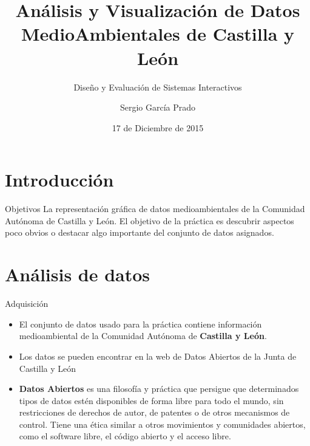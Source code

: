 \documentclass{beamer}
\title[Análisis y Visualización de Datos MedioAmbientales de Castilla y León]{Análisis y Visualización de Datos MedioAmbientales de Castilla y León}
\subtitle[Diseño y Evaluación de Sistemas Interactivos]{Diseño y Evaluación de Sistemas Interactivos}
\author{Sergio García Prado\\}
\date{17 de Diciembre de 2015}
\begin{document}

	\begin{frame}
		\titlepage
	\end{frame}

	
	\begin{frame}
		\tableofcontents
	\end{frame}


	\section{Introducción}

		\begin{frame}{Objetivos}
 			La representación gráfica de datos medioambientales de la Comunidad Autónoma de Castilla y León. El objetivo de la práctica es descubrir aspectos poco obvios o destacar algo importante del conjunto de datos asignados.

		\end{frame}
		
	\section{Análisis de datos}
	
		\begin{frame}{Adquisición}
			\begin{itemize}
				
				\item El conjunto de datos usado para la práctica contiene información medioambiental de la Comunidad Autónoma de {\bf Castilla y León}.
				
				\item Los datos se pueden encontrar en la web de Datos Abiertos de la Junta de Castilla y León
				\item {\bf Datos Abiertos} es una filosofía y práctica que persigue que determinados tipos de datos estén disponibles de forma libre para todo el mundo, sin restricciones de derechos de autor, de patentes o de otros mecanismos de control. Tiene una ética similar a otros movimientos y comunidades abiertos, como el software libre, el código abierto y el acceso libre.
			\end{itemize}
		
		\end{frame}
\end{document}
